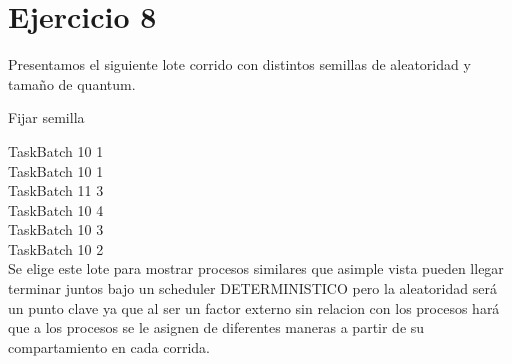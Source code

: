 \section{Ejercicio 8}

Presentamos el siguiente lote corrido con distintos semillas de aleatoridad y tamaño de quantum.

Fijar semilla

TaskBatch 10 1 \\
TaskBatch 10 1 \\
TaskBatch 11 3 \\
TaskBatch 10 4 \\
TaskBatch 10 3 \\
TaskBatch 10 2 \\


Se elige este lote para mostrar procesos similares que asimple vista pueden llegar terminar juntos bajo un scheduler DETERMINISTICO pero la aleatoridad será un punto clave ya que al ser un factor externo sin relacion con los procesos hará que a los procesos se le asignen de diferentes maneras a partir de su compartamiento en cada corrida. 


